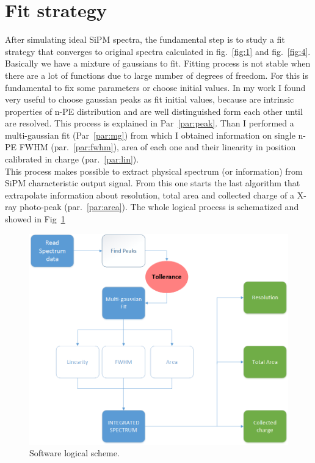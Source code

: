 \documentclass[10pt,a4paper, openany]{book}
\begin{document}
\section{Fit strategy}
After simulating ideal SiPM spectra, the fundamental step is to study a fit strategy that converges to original spectra calculated in fig.~\ref{fig:1} and fig.~\ref{fig:4}.\\
Basically we have a mixture of gaussians to fit. Fitting process is not stable when there are a lot of functions due to large number of degrees of freedom. For this is fundamental to fix some parameters or choose initial values. In my work I found very useful to choose gaussian peaks as fit initial values, because are intrinsic properties of n-PE distribution and are well distinguished form each other until are resolved. This process is explained in Par~\ref{par:peak}. Than I performed a multi-gaussian fit (Par~\ref{par:mg}) from which I obtained information on single n-PE FWHM (par.~\ref{par:fwhm}), area of each one and their linearity in position calibrated in charge (par.~\ref{par:lin}).\\
This process makes possible to extract physical spectrum (or information) from SiPM characteristic output signal. From this one starts the last algorithm that extrapolate information about resolution, total area and collected charge of a X-ray photo-peak (par.~\ref{par:area}).
The whole logical process is schematized and showed in Fig~\ref{fig:7}

\begin{figure}[!h]
\begin{center}
\includegraphics[scale=0.45]{imm/schema.png}
\end{center}
\caption{Software logical scheme.}
\label{fig:7}
\end{figure}
\end{document}
